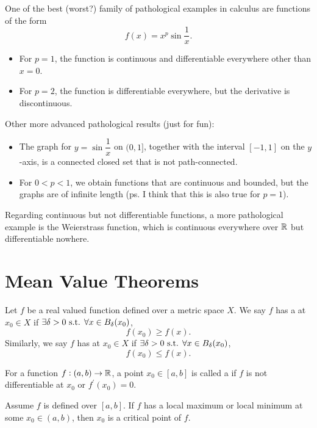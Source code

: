 




\begin{example}
One of the best (worst?) family of pathological examples in calculus are functions of the form
\[ f(x)=x^p\sin\frac{1}{x}. \]
\begin{itemize}
\item For $p=1$, the function is continuous and differentiable everywhere other than $x=0$.
\item For $p=2$, the function is differentiable everywhere, but the derivative is discontinuous.
\end{itemize}

Other more advanced pathological results (just for fun):
\begin{itemize}
\item The graph for $y=\sin\dfrac{1}{x}$ on $(0,1]$, together with the interval $[-1,1]$ on the $y$-axis, is a connected closed set that is not path-connected.
\item For $0<p<1$, we obtain functions that are continuous and bounded, but the graphs are of infinite length (ps. I think that this is also true for $p=1$).
\end{itemize}
Regarding continuous but not differentiable functions, a more pathological example is the Weierstrass function, which is continuous everywhere over $\mathbb R$ but differentiable nowhere.
\end{example}

\section{Mean Value Theorems}
\begin{definition}
Let $f$ be a real valued function defined over a metric space $X$. We say $f$ has a  at $x_0\in X$ if $\exists\delta>0\text{ s.t. }\forall x\in B_\delta(x_0)$,
\[ f(x_0)\ge f(x). \]
Similarly, we say $f$ has  at $x_0\in X$ if $\exists\delta>0\text{ s.t. }\forall x\in B_\delta(x_0)$,
\[ f(x_0)\le f(x). \]
\end{definition}

\begin{definition}
For a function $f:(a,b)\to\mathbb R$, a point $x_0\in[a,b]$ is called a  if $f$ is not differentiable at $x_0$ or $f^\prime(x_0)=0$.
\end{definition}

\begin{theorem}
Assume $f$ is defined over $[a,b]$. If $f$ has a local maximum or local minimum at some $x_0\in(a,b)$, then $x_0$ is a critical point of $f$.
\end{theorem}

